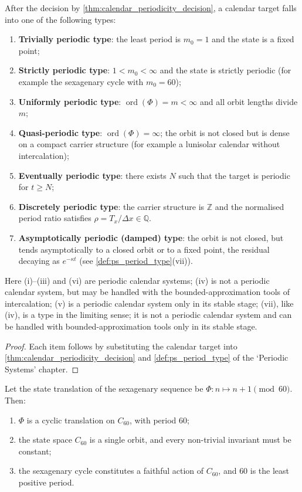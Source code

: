 \begin{corollary}\label{cor:calendar_period_type}
After the decision by \cref{thm:calendar_periodicity_decision}, a calendar target falls into one of the following types:
\begin{enumerate}[label=(\roman*)]
    \item \textbf{Trivially periodic type}: the least period is \(m_0=1\) and the state is a fixed point;
    \item \textbf{Strictly periodic type}: \(1<m_0<\infty\) and the state is strictly periodic (for example the sexagenary cycle with \(m_0=60\));
    \item \textbf{Uniformly periodic type}: \(\operatorname{ord}(\Phi)=m<\infty\) and all orbit lengths divide \(m\);
    \item \textbf{Quasi-periodic type}: \(\operatorname{ord}(\Phi)=\infty\); the orbit is not closed but is dense on a compact carrier structure (for example a lunisolar calendar without intercalation);
    \item \textbf{Eventually periodic type}: there exists \(N\) such that the target is periodic for \(t\ge N\);
    \item \textbf{Discretely periodic type}: the carrier structure is \(\mathbb Z\) and the normalised period ratio satisfies \(\rho=T_x/\Delta x\in\mathbb Q\).
    \item \textbf{Asymptotically periodic (damped) type}: the orbit is not closed, but tends asymptotically to a closed orbit or to a fixed point, the residual decaying as \(e^{-\kappa t}\) (see \cref{def:ps_period_type}(vii)).
\end{enumerate}
Here (i)--(iii) and (vi) are periodic calendar systems; (iv) is not a periodic calendar system, but may be handled with the bounded-approximation tools of intercalation; (v) is a periodic calendar system only in its stable stage; (vii), like (iv), is a type in the limiting sense; it is not a periodic calendar system and can be handled with bounded-approximation tools only in its stable stage.
\end{corollary}

\begin{proof}
Each item follows by substituting the calendar target into \cref{thm:calendar_periodicity_decision} and \cref{def:ps_period_type} of the `Periodic Systems' chapter.
\end{proof}

\begin{lemma}\label{lem:ganzhi_period}
Let the state translation of the sexagenary sequence be \(\Phi:n\mapsto n+1\pmod{60}\). Then:
\begin{enumerate}[label=(\roman*)]
    \item \(\Phi\) is a cyclic translation on \(C_{60}\), with period \(60\);
    \item the state space \(C_{60}\) is a single orbit, and every non-trivial invariant must be constant;
    \item the sexagenary cycle constitutes a faithful action of \(C_{60}\), and \(60\) is the least positive period.
\end{enumerate}
\end{lemma}

